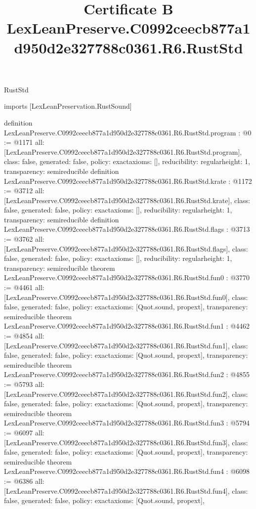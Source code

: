 \begin{lexlean}{RustStd}
\title{Certificate B LexLeanPreserve.C0992ceecb877a1d950d2e327788c0361.R6.RustStd}
\begin{coremodule}
imports [LexLeanPreservation.RustSound]

definition LexLeanPreserve.C0992ceecb877a1d950d2e327788c0361.R6.RustStd.program : @0 := @1171 {
  all: [LexLeanPreserve.C0992ceecb877a1d950d2e327788c0361.R6.RustStd.program],
  class: false,
  generated: false,
  policy: exact{axioms: []},
  reducibility: regular{height: 1},
  transparency: semireducible
}
definition LexLeanPreserve.C0992ceecb877a1d950d2e327788c0361.R6.RustStd.krate : @1172 := @3712 {
  all: [LexLeanPreserve.C0992ceecb877a1d950d2e327788c0361.R6.RustStd.krate],
  class: false,
  generated: false,
  policy: exact{axioms: []},
  reducibility: regular{height: 1},
  transparency: semireducible
}
definition LexLeanPreserve.C0992ceecb877a1d950d2e327788c0361.R6.RustStd.flags : @3713 := @3762 {
  all: [LexLeanPreserve.C0992ceecb877a1d950d2e327788c0361.R6.RustStd.flags],
  class: false,
  generated: false,
  policy: exact{axioms: []},
  reducibility: regular{height: 1},
  transparency: semireducible
}
theorem LexLeanPreserve.C0992ceecb877a1d950d2e327788c0361.R6.RustStd.fun0 : @3770 := @4461 {
  all: [LexLeanPreserve.C0992ceecb877a1d950d2e327788c0361.R6.RustStd.fun0],
  class: false,
  generated: false,
  policy: exact{axioms: [Quot.sound, propext]},
  transparency: semireducible
}
theorem LexLeanPreserve.C0992ceecb877a1d950d2e327788c0361.R6.RustStd.fun1 : @4462 := @4854 {
  all: [LexLeanPreserve.C0992ceecb877a1d950d2e327788c0361.R6.RustStd.fun1],
  class: false,
  generated: false,
  policy: exact{axioms: [Quot.sound, propext]},
  transparency: semireducible
}
theorem LexLeanPreserve.C0992ceecb877a1d950d2e327788c0361.R6.RustStd.fun2 : @4855 := @5793 {
  all: [LexLeanPreserve.C0992ceecb877a1d950d2e327788c0361.R6.RustStd.fun2],
  class: false,
  generated: false,
  policy: exact{axioms: [Quot.sound, propext]},
  transparency: semireducible
}
theorem LexLeanPreserve.C0992ceecb877a1d950d2e327788c0361.R6.RustStd.fun3 : @5794 := @6097 {
  all: [LexLeanPreserve.C0992ceecb877a1d950d2e327788c0361.R6.RustStd.fun3],
  class: false,
  generated: false,
  policy: exact{axioms: [Quot.sound, propext]},
  transparency: semireducible
}
theorem LexLeanPreserve.C0992ceecb877a1d950d2e327788c0361.R6.RustStd.fun4 : @6098 := @6386 {
  all: [LexLeanPreserve.C0992ceecb877a1d950d2e327788c0361.R6.RustStd.fun4],
  class: false,
  generated: false,
  policy: exact{axioms: [Quot.sound, propext]},
}
\end{coremodule}
\end{lexlean}
